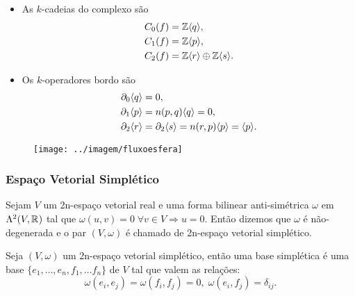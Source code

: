 \documentclass{beamer}
\begin{document}
	\begin{frame}
		
		\begin{minipage}[t]{0.5\linewidth}
			\begin{itemize}
				\item As $k$-cadeias do complexo são
				$$
				\begin{aligned}
				C_{0}(f) &= \mathbb{Z}\langle q\rangle, 
				\\
				C_{1}(f) &= \mathbb{Z}\langle p\rangle,
				\\
				C_{2}(f) &= \mathbb{Z}\langle r\rangle\oplus\mathbb{Z}\langle s\rangle.
				\end{aligned}
				$$
				
				\item Os $k$-operadores bordo são
				$$
				\begin{aligned}
				\partial_{0}\langle q\rangle &=0, 
				\\
				\partial_{1}\langle p\rangle &=n(p,q)\langle q\rangle = 0,
				\\
				\partial_{2}\langle r\rangle&=\partial_{2}\langle s\rangle = n(r,p)\langle p\rangle = \langle p\rangle.
				\end{aligned}
				$$
				
			\end{itemize}
		\end{minipage}
		\hfill%
		\begin{minipage}[t]{0.4\linewidth}
			\begin{figure}
				\centering
				\textbf{}\par
				\texttt{[image: ../imagem/fluxoesfera]}
			\end{figure}
			
		\end{minipage}
		
	\end{frame}
	

	\begin{frame}
		\frametitle{Espaço Vetorial Simplético}
		\begin{definicao}
			Sejam $V$ um 2n-espaço vetorial real e uma forma bilinear anti-simétrica $\omega$ em $\Lambda^{2}(V, \mathbb{R}^{})$ tal que $\omega(u,v) = 0 \; \forall v \in V \Rightarrow u=0$. Então dizemos que $\omega$ é não-degenerada e o par $(V, \omega)$ é chamado de 2n-espaço vetorial simplético.
		\end{definicao}
		\begin{definicao}
			Seja $(V, \omega)$ um 2n-espaço vetorial simplético, então uma base simplética é uma base $\{ e_{1},\dots, e_{n},f_{1},\dots f_{n}\}$ de $V$ tal que valem as relações:
			$$
			\omega(e_{i}, e_{j}) = \omega(f_{i}, f_{j}) = 0, \; \omega(e_{i}, f_{j}) = \delta_{ij}.
			$$
		\end{definicao}
		
	\end{frame}
	
\end{document}

